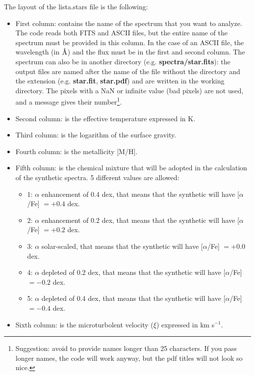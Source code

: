 \documentclass[modern]{aastex701}
\newcommand{\angstrom}{\mbox{\normalfont\AA}}
\begin{document}
The layout of the lista.stars file is the following:
\begin{itemize}
    \item First column: contains the name of the spectrum that you want to analyze. The code reads both FITS and ASCII files, but the entire name of the spectrum must be provided in this column. In the case of an ASCII file, the wavelength (in $\angstrom$) and the flux must be in the first and second column. The spectrum can also be in another directory (e.g. {\bf spectra/star.fits}): the output files are named after the name of the file without the directory and the extension (e.g. {\bf star.fit}, {\bf star.pdf}) and are written in the working directory. The pixels with a NaN or infinite value (bad pixels) are not used, and a message gives their number\footnote{Suggestion: avoid to provide names longer than 25 characters. If you pass longer names, the code will work anyway, but the pdf titles will not look so nice.}. 
    \item Second column: is the effective temperature expressed in K.
    \item Third column: is the logarithm of the surface gravity.
    \item Fourth column: is the metallicity [M/H].
    \item Fifth column: is the chemical mixture that will be adopted in the calculation of the synthetic spectra. 5 different values are allowed:
    \begin{itemize}
        \item 1: $\alpha$ enhancement of 0.4 dex, that means that the synthetic will have [$\alpha$/Fe] $= +0.4$ dex.
        \item 2: $\alpha$ enhancement of 0.2 dex, that means that the synthetic will have [$\alpha$/Fe] $= +0.2$ dex.
        \item 3: $\alpha$ solar-scaled, that means that the synthetic will have [$\alpha$/Fe] $= +0.0$ dex.
        \item 4: $\alpha$ depleted of 0.2 dex, that means that the synthetic will have [$\alpha$/Fe] $= -0.2$ dex.
        \item 5: $\alpha$ depleted of 0.4 dex, that means that the synthetic will have [$\alpha$/Fe] $= -0.4$ dex.
    \end{itemize}
    \item Sixth column: is the microturbolent velocity ($\xi$) expressed in km s$^{-1}$. 
    

\end{itemize}
\end{document}
